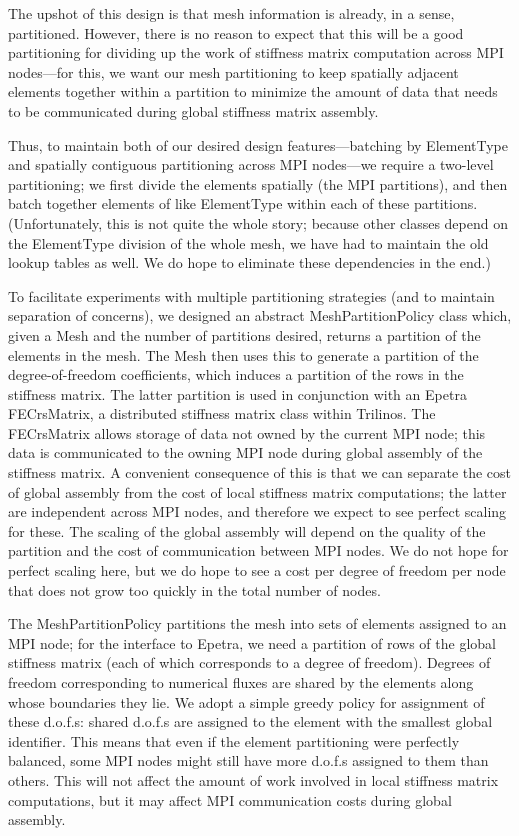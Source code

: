 \documentclass{article}
\begin{document}
The upshot of this design is that mesh information is already, in a sense, partitioned.  However, there is no reason to expect that this will be a good partitioning for dividing up the work of stiffness matrix computation across MPI nodes---for this, we want our mesh partitioning to keep spatially adjacent elements together within a partition to minimize the amount of data that needs to be communicated during global stiffness matrix assembly.

Thus, to maintain both of our desired design features---batching by ElementType and spatially contiguous partitioning across MPI nodes---we require a two-level partitioning; we first divide the elements spatially (the MPI partitions), and then batch together elements of like ElementType within each of these partitions.  (Unfortunately, this is not quite the whole story; because other classes depend on the ElementType division of the whole mesh, we have had to maintain the old lookup tables as well.  We do hope to eliminate these dependencies in the end.)

To facilitate experiments with multiple partitioning strategies (and to maintain separation of concerns), we designed an abstract MeshPartitionPolicy class which, given a Mesh and the number of partitions desired, returns a partition of the elements in the mesh.  The Mesh then uses this to generate a partition of the degree-of-freedom coefficients, which induces a partition of the rows in the stiffness matrix.  The latter partition is used in conjunction with an Epetra FECrsMatrix, a distributed stiffness matrix class within Trilinos.  The FECrsMatrix allows storage of data not owned by the current MPI node; this data is communicated to the owning MPI node during global assembly of the stiffness matrix.  A convenient consequence of this is that we can separate the cost of global assembly from the cost of local stiffness matrix computations; the latter are independent across MPI nodes, and therefore we expect to see perfect scaling for these.  The scaling of the global assembly will depend on the quality of the partition and the cost of communication between MPI nodes.  We do not hope for perfect scaling here, but we do hope to see a cost per degree of freedom per node that does not grow too quickly in the total number of nodes.

The MeshPartitionPolicy partitions the mesh into sets of elements assigned to an MPI node; for the interface to Epetra, we need a partition of rows of the global stiffness matrix (each of which corresponds to a degree of freedom).  Degrees of freedom corresponding to numerical fluxes are shared by the elements along whose boundaries they lie.  We adopt a simple greedy policy for assignment of these d.o.f.s: shared d.o.f.s are assigned to the element with the smallest global identifier.  This means that even if the element partitioning were perfectly balanced, some MPI nodes might still have more d.o.f.s assigned to them than others.  This will not affect the amount of work involved in local stiffness matrix computations, but it may affect MPI communication costs during global assembly.
\end{document}
